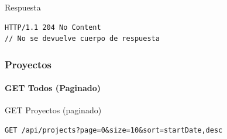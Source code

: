 \documentclass[11pt,a4paper]{article}
\begin{document}
\begin{center}
	\begin{minipage}{\textwidth}
		\begin{codebox}{Respuesta}
			\begin{lstlisting}[language=HTTP]
HTTP/1.1 204 No Content
// No se devuelve cuerpo de respuesta
\end{lstlisting}
		\end{codebox}
	\end{minipage}
\end{center}

\subsubsection{Proyectos}

\paragraph{GET Todos (Paginado)}

\begin{center}
	\begin{minipage}{\textwidth}
		\begin{codebox}{GET Proyectos (paginado)}
			\begin{lstlisting}[language=HTTP]
GET /api/projects?page=0&size=10&sort=startDate,desc
\end{lstlisting}
		\end{codebox}
	\end{minipage}
\end{center}
\end{document}
